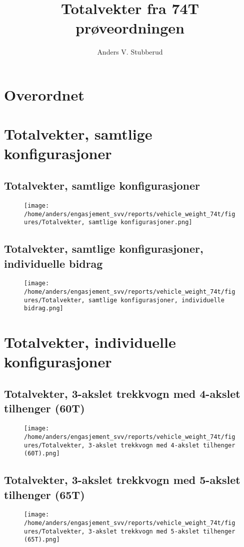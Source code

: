 \documentclass{article}
\begin{document}
\title{Totalvekter fra 74T prøveordningen}
\author{Anders V. Stubberud}
\maketitle
\tableofcontents
\newpage
\section{Overordnet}

\section{Totalvekter, samtlige konfigurasjoner}
\subsection{Totalvekter, samtlige konfigurasjoner}
\begin{figure}[H]
\centering
\texttt{[image: /home/anders/engasjement\_svv/reports/vehicle\_weight\_74t/figures/Totalvekter, samtlige konfigurasjoner.png]}
\end{figure}
\subsection{Totalvekter, samtlige konfigurasjoner, individuelle bidrag}
\begin{figure}[H]
\centering
\texttt{[image: /home/anders/engasjement\_svv/reports/vehicle\_weight\_74t/figures/Totalvekter, samtlige konfigurasjoner, individuelle bidrag.png]}
\end{figure}
\section{Totalvekter, individuelle konfigurasjoner}
\subsection{Totalvekter, 3-akslet trekkvogn med 4-akslet tilhenger (60T)}
\begin{figure}[H]
\centering
\texttt{[image: /home/anders/engasjement\_svv/reports/vehicle\_weight\_74t/figures/Totalvekter, 3-akslet trekkvogn med 4-akslet tilhenger (60T).png]}
\end{figure}
\subsection{Totalvekter, 3-akslet trekkvogn med 5-akslet tilhenger (65T)}
\begin{figure}[H]
\centering
\texttt{[image: /home/anders/engasjement\_svv/reports/vehicle\_weight\_74t/figures/Totalvekter, 3-akslet trekkvogn med 5-akslet tilhenger (65T).png]}
\end{figure}
\end{document}
